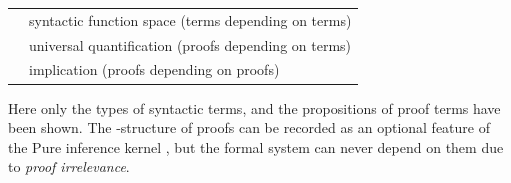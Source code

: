 \begin{isabellebody}
\begin{isamarkuptext}
  \medskip
  \begin{tabular}{ll}
  \isa{{\isachardoublequote}{\isasymalpha}\ {\isasymRightarrow}\ {\isasymbeta}{\isachardoublequote}} & syntactic function space (terms depending on terms) \\
  \isa{{\isachardoublequote}{\isasymAnd}x{\isachardot}\ B{\isacharparenleft}x{\isacharparenright}{\isachardoublequote}} & universal quantification (proofs depending on terms) \\
  \isa{{\isachardoublequote}A\ {\isasymLongrightarrow}\ B{\isachardoublequote}} & implication (proofs depending on proofs) \\
  \end{tabular}
  \medskip

  \noindent Here only the types of syntactic terms, and the
  propositions of proof terms have been shown.  The \isa{{\isachardoublequote}{\isasymlambda}{\isachardoublequote}}-structure of proofs can be recorded as an optional feature of
  the Pure inference kernel \cite{Berghofer-Nipkow:2000:TPHOL}, but
  the formal system can never depend on them due to \emph{proof
  irrelevance}.


\end{isamarkuptext}
\end{isabellebody}
